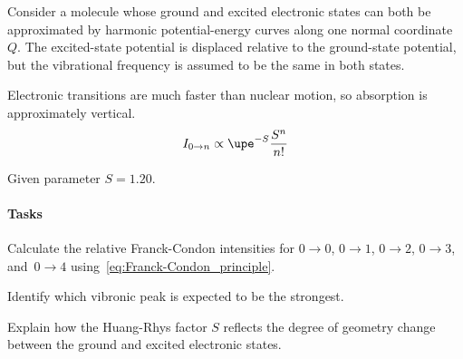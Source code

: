 \begin{problem}[note = Vibronic Transitions and the Franck-Condon Principle]
  Consider a molecule whose ground and excited electronic states can both be
  approximated by harmonic potential-energy curves along one normal
  coordinate $Q$. The excited-state potential is displaced relative to the
  ground-state potential, but the vibrational frequency is assumed to be the
  same in both states.
  \begin{remark}[note = Franck-Condon principle]
    Electronic transitions are much faster than nuclear
    motion, so absorption is approximately vertical.
    \begin{equation}\label{eq:Franck-Condon_principle}
      I_{0\to n} \propto \upe^{-S} \frac{S^n}{n!}
    \end{equation}
  \end{remark}
  Given parameter $S = 1.20$.
  \paragraph{Tasks}
  \begin{enumext}
    \item Calculate the relative Franck-Condon intensities for $0 \to 0$,
    $0 \to 1$, $0 \to 2$, $0 \to 3$, and~$0 \to 4$
    using~\eqref{eq:Franck-Condon_principle}.
    \item Identify which vibronic peak is expected to be the strongest.
    \item Explain how the Huang-Rhys factor $S$ reflects the degree of geometry
    change between the ground and excited electronic states.
  \end{enumext}
\end{problem}
